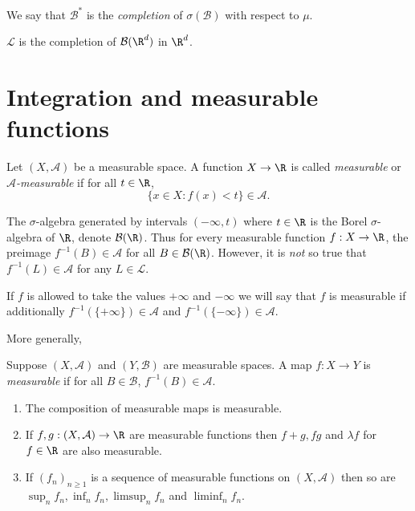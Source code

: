 \documentclass[a4paper]{article}
\begin{document}
\begin{definition}[completion]
  We say that \(\mathcal B^*\) is the \emph{completion} of \(\sigma(\mathcal B)\) with respect to \(\mu\).
\end{definition}

\begin{eg}
  \(\mathcal L\) is the completion of \(\mathcal B(\R^d)\) in \(\R^d\).
\end{eg}

\section{Integration and measurable functions}

\begin{definition}
  Let \((X, \mathcal A)\) be a measurable space. A function \(X \to \R\) is called \emph{measurable} or \emph{\(\mathcal A\)-measurable} if for all \(t \in \R\),
  \[
    \{x \in X: f(x) < t\} \in \mathcal A.
  \]
\end{definition}

\begin{remark}
  The \(\sigma\)-algebra generated by intervals \((-\infty, t)\) where \(t \in \R\) is the Borel \(\sigma\)-algebra of \(\R\), denote \(\mathcal B(\R)\). Thus for every measurable function \(f: X \to \R\), the preimage \(f^{-1}(B) \in \mathcal A\) for all \(B \in \mathcal B(\R)\). However, it is \emph{not} so true that \(f^{-1}(L) \in \mathcal A\) for any \(L \in \mathcal L\).
\end{remark}

\begin{remark}
  If \(f\) is allowed to take the values \(+\infty\) and \(-\infty\) we will say that \(f\) is measurable if additionally \(f^{-1}(\{+\infty\}) \in \mathcal A\) and \(f^{-1}(\{-\infty\}) \in \mathcal A\).
\end{remark}

More generally,

\begin{definition}
  Suppose \((X, \mathcal A)\) and \((Y, \mathcal B)\) are measurable spaces. A map \(f: X \to Y\) is \emph{measurable} if for all \(B \in \mathcal B\), \(f^{-1}(B) \in \mathcal A\).
\end{definition}

\begin{proposition}\leavevmode
  \begin{enumerate}
  \item The composition of measurable maps is measurable.
  \item If \(f, g: (X, \mathcal A) \to \R\) are measurable functions then \(f + g, fg\) and \(\lambda f\) for \(f \in \R\) are also measurable.
  \item If \((f_n)_{n \geq 1}\) is a sequence of measurable functions on \((X, \mathcal A)\) then so are \(\sup_n f_n, \inf_n f_n, \limsup_n f_n\) and \(\liminf_n f_n\).
  \end{enumerate}
\end{proposition}
\end{document}
